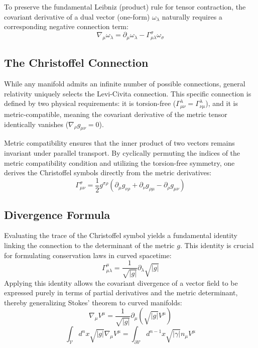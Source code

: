 \documentclass[11pt, a4paper]{report}
\begin{document}
To preserve the fundamental Leibniz (product) rule for tensor contraction, the covariant derivative of a dual vector (one-form) $\omega_\lambda$ naturally requires a corresponding negative connection term:
\begin{equation}
\nabla_\mu \omega_\lambda = \partial_\mu \omega_\lambda - \Gamma^\sigma_{\mu\lambda} \omega_\sigma
\end{equation}

\subsection*{The Christoffel Connection}
While any manifold admits an infinite number of possible connections, general relativity uniquely selects the Levi-Civita connection. This specific connection is defined by two physical requirements: it is torsion-free ($\Gamma^\lambda_{\mu\nu} = \Gamma^\lambda_{\nu\mu}$), and it is metric-compatible, meaning the covariant derivative of the metric tensor identically vanishes ($\nabla_\rho g_{\mu\nu} = 0$). 

Metric compatibility ensures that the inner product of two vectors remains invariant under parallel transport. By cyclically permuting the indices of the metric compatibility condition and utilizing the torsion-free symmetry, one derives the Christoffel symbols directly from the metric derivatives:
\begin{equation}\label{eq:christoffel_formula}
\Gamma^\sigma_{\mu\nu} = \frac{1}{2} g^{\sigma\rho} ( \partial_\mu g_{\nu\rho} + \partial_\nu g_{\rho\mu} - \partial_\rho g_{\mu\nu} )
\end{equation}

\subsection*{Divergence Formula}
Evaluating the trace of the Christoffel symbol yields a fundamental identity linking the connection to the determinant of the metric $g$. This identity is crucial for formulating conservation laws in curved spacetime:
\begin{equation}\label{eq:gamma_contracted}
\Gamma^\mu_{\mu\lambda} = \frac{1}{\sqrt{|g|}} \partial_\lambda \sqrt{|g|}
\end{equation}
Applying this identity allows the covariant divergence of a vector field to be expressed purely in terms of partial derivatives and the metric determinant, thereby generalizing Stokes' theorem to curved manifolds:
\begin{equation}
\nabla_\mu V^\mu = \frac{1}{\sqrt{|g|}} \partial_\mu (\sqrt{|g|} V^\mu)
\end{equation}
\begin{equation}
\int_{\mathcal{V}} d^n x \sqrt{|g|} \nabla_\mu V^\mu = \int_{\partial \mathcal{V}} d^{n-1} x \sqrt{|\gamma|} n_\mu V^\mu
\end{equation}
\end{document}
